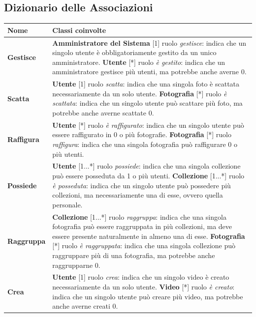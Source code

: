 \documentclass[a4paper]{article}
\begin{document}
	
	\newpage
	\vspace{35pt}
	\subsection{Dizionario delle Associazioni}
	\vspace{8pt}
	\begin{tabular}{p{90pt}p{180pt}}
		\hline
		\textbf{Nome} &
		\textbf{Classi coinvolte}
		\\
		\hline
		\hline
		\hline
		
		\textbf{Gestisce} &
		\textbf{Amministratore del Sistema} [1] ruolo
		\emph{gestisce}: indica
		che un singolo utente è obbligatoriamente gestito da
		un unico amministratore.
		\newline
		\textbf{Utente} [*] ruolo \emph{è gestito}: indica
		che un amministratore gestisce  più utenti, ma
		potrebbe anche averne 0.		
		\\
		\hline
		
		\textbf{Scatta} &
		\textbf{Utente} [1] ruolo
		\emph{scatta}: indica
		che una singola foto è scattata necessariamente da un
		solo utente.
		\newline
		\textbf{Fotografia} [*] ruolo \emph{è scattata}:
		indica
		che un singolo utente può scattare più foto, ma
		potrebbe anche averne scattate 0.
		\\
		\hline

		\textbf{Raffigura} &
		\textbf{Utente} [*] ruolo
		\emph{è raffigurato}: indica
		che un singolo utente può essere raffigurato in
		0 o più fotografie.
		\newline
		\textbf{Fotografia} [*] ruolo \emph{raffigura}:
		indica
		che una singola fotografia può raffigurare 0 o più
		utenti.		
		\\
		\hline

		\textbf{Possiede} &
		\textbf{Utente} [1...*] ruolo
		\emph{possiede}: indica
		che una singola collezione può essere posseduta da 1
		o più
		utenti.
		\newline
		\textbf{Collezione} [1...*] ruolo \emph{è posseduta}:
		indica che un singolo utente può possedere più
		collezioni, ma necessariamente una di esse, ovvero
		quella personale.
		\\
		\hline

		\textbf{Raggruppa} &
		\textbf{Collezione} [1...*] ruolo
		\emph{raggruppa}: indica
		che una singola fotografia può essere raggruppata in
		più
		collezioni, ma deve essere presente naturalmente in
		almeno una di esse.
		\newline
		\textbf{Fotografia} [*] ruolo \emph{è raggruppata}:
		indica che una singola collezione può raggruppare più
		di una
		fotografia, ma potrebbe anche raggrupparne 0.
		\\
		\hline		

		\textbf{Crea} &
		\textbf{Utente} [1] ruolo
		\emph{crea}: indica che un singolo video è
		creato necessariamente da un solo utente.
		\newline
		\textbf{Video} [*] ruolo \emph{è creato}:
		indica
		che un singolo utente può creare più video, ma
		potrebbe anche averne creati 0.
		\\
		\hline
	\end{tabular}
	\newpage
	
\end{document}
